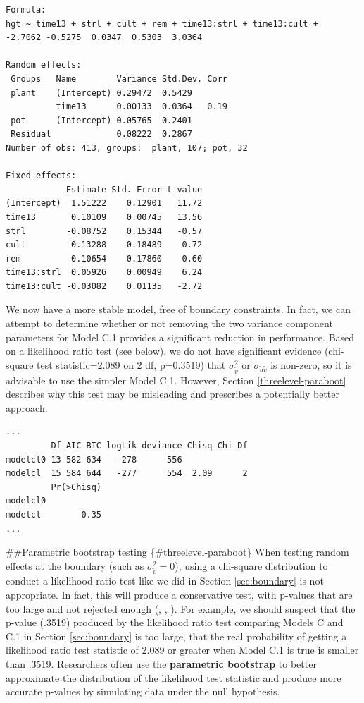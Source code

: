 \documentclass[
]{krantz}
\begin{document}
\begin{verbatim}
Formula: 
hgt ~ time13 + strl + cult + rem + time13:strl + time13:cult +  
-2.7062 -0.5275  0.0347  0.5303  3.0364 

Random effects:
 Groups   Name        Variance Std.Dev. Corr
 plant    (Intercept) 0.29472  0.5429       
          time13      0.00133  0.0364   0.19
 pot      (Intercept) 0.05765  0.2401       
 Residual             0.08222  0.2867       
Number of obs: 413, groups:  plant, 107; pot, 32

Fixed effects:
            Estimate Std. Error t value
(Intercept)  1.51222    0.12901   11.72
time13       0.10109    0.00745   13.56
strl        -0.08752    0.15344   -0.57
cult         0.13288    0.18489    0.72
rem          0.10654    0.17860    0.60
time13:strl  0.05926    0.00949    6.24
time13:cult -0.03082    0.01135   -2.72
\end{verbatim}

We now have a more stable model, free of boundary constraints. In fact, we can attempt to determine whether or not removing the two variance component parameters for Model C.1 provides a significant reduction in performance. Based on a likelihood ratio test (see below), we do not have significant evidence (chi-square test statistic=2.089 on 2 df, p=0.3519) that \(\sigma_{\tilde{v}}^{2}\) or \(\sigma_{\tilde{u}\tilde{v}}\) is non-zero, so it is advisable to use the simpler Model C.1. However, Section \ref{threelevel-paraboot} describes why this test may be misleading and prescribes a potentially better approach.

\begin{verbatim}
...
         Df AIC BIC logLik deviance Chisq Chi Df
modelcl0 13 582 634   -278      556             
modelcl  15 584 644   -277      554  2.09      2
         Pr(>Chisq)
modelcl0           
modelcl        0.35
...
\end{verbatim}

\#\#Parametric bootstrap testing \{\#threelevel-paraboot\}
When testing random effects at the boundary (such as \(\sigma_{\tilde{v}}^{2} = 0\)), using a chi-square distribution to conduct a likelihood ratio test like we did in Section \ref{sec:boundary} is not appropriate. In fact, this will produce a conservative test, with p-values that are too large and not rejected enough (\citet{Bryk2002}, \citet{Singer2003}, \citet{Faraway2005}). For example, we should suspect that the p-value (.3519) produced by the likelihood ratio test comparing Models C and C.1 in Section \ref{sec:boundary} is too large, that the real probability of getting a likelihood ratio test statistic of 2.089 or greater when Model C.1 is true is smaller than .3519. Researchers often use the \textbf{parametric bootstrap} to better approximate the distribution of the likelihood test statistic and produce more accurate p-values by simulating data under the null hypothesis.
\end{document}
